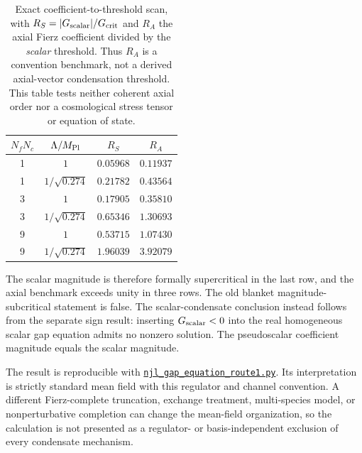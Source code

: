 \documentclass[aps,prd,twocolumn,superscriptaddress,showpacs,preprintnumbers,nofootinbib,longbibliography,floatfix]{revtex4-2}
\newcommand{\artifactnamed}[2]{\href{https://github.com/Hubify-Projects/bigbounce/blob/main/#1}{\nolinkurl{#2}}}
\begin{document}
\begin{table}[tb]
\caption{Exact coefficient-to-threshold scan, with
$R_S=|G_{\rm scalar}|/G_{\rm crit}$ and $R_A$ the axial Fierz coefficient
divided by the \emph{scalar} threshold.  Thus $R_A$ is a convention benchmark,
not a derived axial-vector condensation threshold.  This table tests neither
coherent axial order nor a cosmological stress tensor or equation of state.}
\begin{ruledtabular}
\begin{tabular}{cccc}
$N_fN_c$ & $\Lambda/M_{\rm Pl}$ & $R_S$ & $R_A$ \\
\hline
1 & $1$ & $0.05968$ & $0.11937$ \\
1 & $1/\sqrt{0.274}$ & $0.21782$ & $0.43564$ \\
3 & $1$ & $0.17905$ & $0.35810$ \\
3 & $1/\sqrt{0.274}$ & $0.65346$ & $1.30693$ \\
9 & $1$ & $0.53715$ & $1.07430$ \\
9 & $1/\sqrt{0.274}$ & $1.96039$ & $3.92079$ \\
\end{tabular}
\end{ruledtabular}
\end{table}

The scalar magnitude is therefore formally supercritical in the last row,
and the axial benchmark exceeds unity in three rows.  The old blanket
magnitude-subcritical statement is false.  The scalar-condensate conclusion
instead follows from the separate sign result: inserting
$G_{\rm scalar}<0$ into the real homogeneous scalar gap equation admits no
nonzero solution.  The pseudoscalar coefficient magnitude equals the scalar
magnitude.

The result is reproducible with
\artifactnamed{arxiv/scripts/njl_gap_equation_route1.py}{njl_gap_equation_route1.py}.  Its interpretation is
strictly standard mean field with this regulator and channel convention.  A
different Fierz-complete truncation, exchange treatment, multi-species model,
or nonperturbative completion can change the mean-field organization, so the
calculation is not presented as a regulator- or basis-independent exclusion
of every condensate mechanism.
\end{document}
